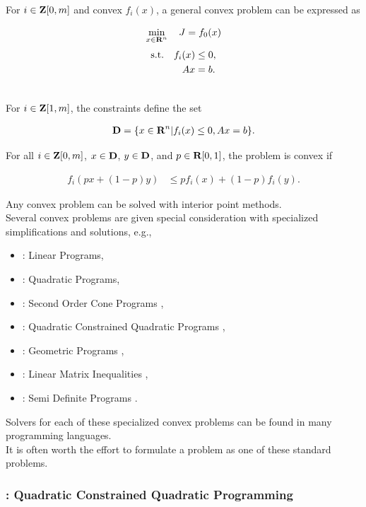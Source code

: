 \documentclass{article}
\begin{document}
For $i\in\textbf{Z}[0,m]$ and convex $f_i(x)$, a general convex problem can be expressed as

\begin{align*}
    \min_{x\in\textbf{R}^n}\quad J = f_0(x)
\end{align*}
\begin{align*}
    \text{s.t.} \quad f_i(x)&\leq 0,\\
    A x&=b.
\end{align*}

\\
For $i\in\textbf{Z}[1,m]$, the constraints define the set

\begin{align*}
    \textbf{D} = \{x\in\textbf{R}^n| f_i(x)\leq 0, Ax =b\}.
\end{align*}

For all $i\in\textbf{Z}[0,m]$, $x\in\textbf{D}$, $y\in\textbf{D}$, and $p\in\textbf{R}[0,1]$, the problem is convex if

\begin{align*}
    f_i(px+(1-p)y)&\leq p f_i(x)+(1-p)f_i(y).
\end{align*}


Any convex problem can be solved with interior point methods.\\
Several convex problems are given special consideration with specialized simplifications and solutions,
e.g.,
\begin{itemize}
    \item \LP: Linear Programs,
    \item \QP: Quadratic Programs,
    \item \SOCP: Second Order Cone Programs \cite[p.~158]{bv_cvxbook},
    \item \QCQP: Quadratic Constrained Quadratic Programs \cite[p.~152]{bv_cvxbook}\cite{sdp},
    \item \GP: Geometric Programs \cite[p.~161]{bv_cvxbook},
    \item \LMI: Linear Matrix Inequalities \cite[p.~169]{bv_cvxbook},
    \item \SDP: Semi Definite Programs \cite[p.~168]{bv_cvxbook}\cite{sdp}.
\end{itemize}
Solvers for each of these specialized convex problems can be found in many programming languages.\\
It is often worth the effort to formulate a problem as one of these standard problems.

\clearpage

\subsubsection{\QCQP: Quadratic Constrained Quadratic Programming}
\end{document}
